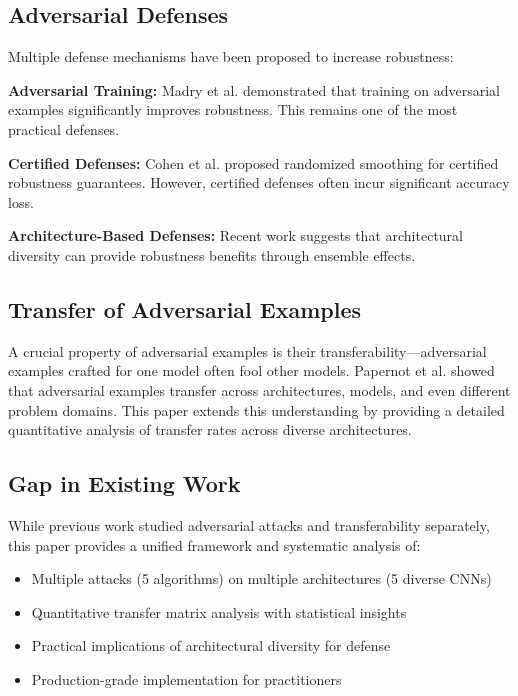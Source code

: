 \documentclass[10pt,conference]{IEEEtran}
\begin{document}
\subsection{Adversarial Defenses}

Multiple defense mechanisms have been proposed to increase robustness:

\textbf{Adversarial Training:} Madry et al. \cite{madry2019deep} demonstrated that training on adversarial examples significantly improves robustness. This remains one of the most practical defenses.

\textbf{Certified Defenses:} Cohen et al. \cite{cohen2019certified} proposed randomized smoothing for certified robustness guarantees. However, certified defenses often incur significant accuracy loss.

\textbf{Architecture-Based Defenses:} Recent work \cite{papernot2018ensemble} suggests that architectural diversity can provide robustness benefits through ensemble effects.

\subsection{Transfer of Adversarial Examples}

A crucial property of adversarial examples is their transferability---adversarial examples crafted for one model often fool other models. Papernot et al. \cite{papernot2016transferability} showed that adversarial examples transfer across architectures, models, and even different problem domains. This paper extends this understanding by providing a detailed quantitative analysis of transfer rates across diverse architectures.

\subsection{Gap in Existing Work}

While previous work studied adversarial attacks and transferability separately, this paper provides a unified framework and systematic analysis of:
\begin{itemize}
    \item Multiple attacks (5 algorithms) on multiple architectures (5 diverse CNNs)
    \item Quantitative transfer matrix analysis with statistical insights
    \item Practical implications of architectural diversity for defense
    \item Production-grade implementation for practitioners
\end{itemize}
\end{document}
